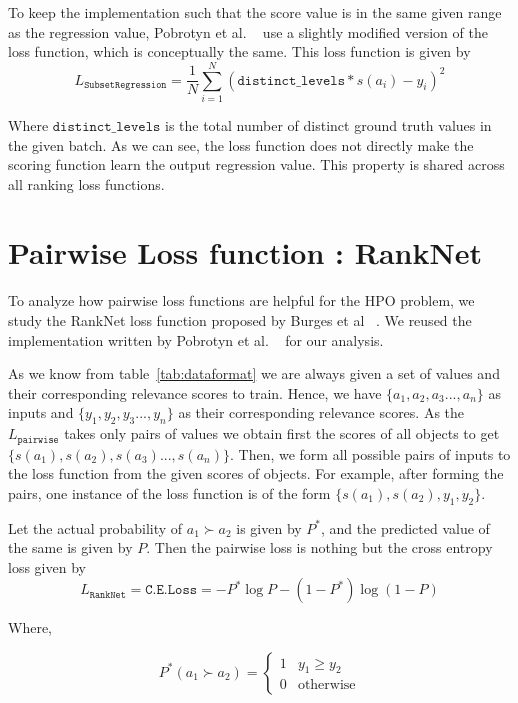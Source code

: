 \documentclass[12pt, twoside, ngerman]{report}
\begin{document}
To keep the implementation such that the score value is in the same given range as the regression value,  Pobrotyn et al. ~\cite{Pobrotyn2020ContextAwareLT} use a slightly modified version of the loss function, which is conceptually the same.
This loss function is given by
\begin{equation}
L_{\texttt{SubsetRegression}} = \frac{1}{N} \sum\limits_{i=1}^{N} (\texttt{distinct\_levels} * s(a_i) - y_i)^2
\end{equation}

Where $\texttt{distinct\_levels}$ is the total number of distinct ground truth values in the given batch.
As we can see, the loss function does not directly make the scoring
function learn the output regression value.
This property is shared across all ranking loss functions.

\section{Pairwise Loss function : RankNet}

To analyze how pairwise loss functions are helpful for the HPO problem,
we study the RankNet loss function proposed by Burges
 et al ~\cite{ranknetpaper}.
We reused the implementation written by Pobrotyn et al. ~\cite{Pobrotyn2020ContextAwareLT} for our analysis.

As we know from table~\ref{tab:dataformat} we are always given a set of values and their corresponding relevance scores to train.
Hence, we have $\{a_1, a_2, a_3..., a_n\}$ as inputs and $\{y_1, y_2, y_3..., y_n\}$ as their corresponding relevance scores.
As the $L_{\texttt{pairwise}}$ takes only pairs of values we obtain first the scores of all objects to get $\{s(a_1), s(a_2), s(a_3)..., s(a_n)\}$.
Then,  we form all possible pairs of inputs to the loss function from the given scores of objects.
For example,  after forming the pairs, one instance of the loss function is of the form $\{s(a_1), s(a_2), y_1, y_2\}$.

Let the actual probability of $a_1 \succ a_2$ is given by $P^*$,  and the predicted value of the same is given by $P$.
Then the pairwise loss is nothing but the cross entropy loss given by
\begin{equation}
L_{\texttt{RankNet}} = \texttt{C.E.Loss} = -P^*\log P - (1 - P^*)\log(1-P)
\end{equation}

Where,

\begin{equation}
  P^*(a_1 \succ a_2) =
    \begin{cases}
      1 & y_1 \geq y_2 \\
      0 & \text{otherwise}
    \end{cases}       
\end{equation}
\end{document}
